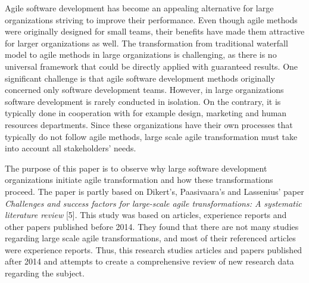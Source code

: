 Agile software development has become an appealing alternative for
large organizations striving to improve their performance. Even
though agile methods were originally designed for small teams, their
benefits have made them attractive for larger organizations as well.
The transformation from traditional waterfall model to agile methods
in large organizations is challenging, as there is no universal
framework that could be directly applied with guaranteed results.
One significant challenge is that agile software development methods
originally concerned only software development teams. However, in
large organizations software development is rarely conducted in
isolation. On the contrary, it is typically done in cooperation with for
example design, marketing and human resources departments. Since these
organizations have their own processes that typically do not follow
agile methods, large scale agile transformation must take into account
all stakeholders' needs.

The purpose of this paper is to observe why large software development
organizations initiate agile transformation and how these transformations
proceed. The paper is partly based on Dikert's, Paasivaara's and Lassenius'
paper \textit{Challenges and success factors for large-scale agile
transformations: A systematic literature review} [5]. This study was based on
articles, experience reports and other papers published before 2014. They found
that there are not many studies regarding large scale agile transformations,
and most of their referenced articles were experience reports. Thus, this
research studies articles and papers published after 2014 and attempts to
create a comprehensive review of new research data regarding the subject.
